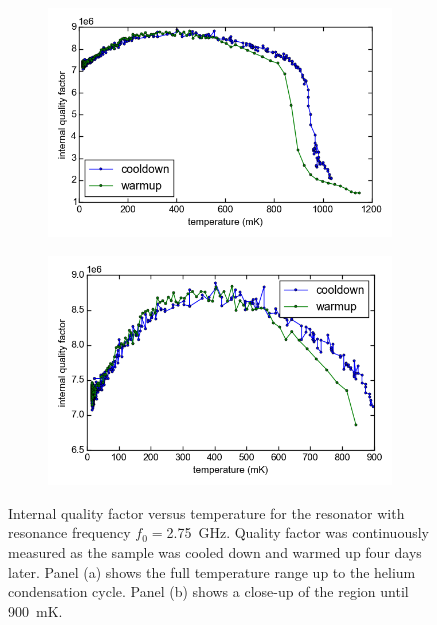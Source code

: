 \documentclass[12pt]{report}
\newcommand{\figureinset}[3]{\llap{\parbox[b]{#2in}{#1\\\rule{0ex}{#3in}}}}
\begin{document}
\begin{figure}[h]
    \centering
    \begin{subfigure}[b]{.49\textwidth}
        \label{fig:temperature_tracking_Qi_drop}
        \includegraphics[width=\textwidth]{Figures/Temperature tracking drop - Qi vs T.png}\figureinset{(a)}{2.65}{1.92}
    \end{subfigure}
    \begin{subfigure}[b]{.49\textwidth}
        \label{fig:temperature_tracking_Qi_nodrop}
        \includegraphics[width=\textwidth]{Figures/Temperature tracking - no drop - Qi vs T.png}\figureinset{(b)}{2.57}{1.92}
    \end{subfigure}
    \caption{Internal quality factor versus temperature for the resonator with resonance frequency $f_0= $\SI{2.75}{\giga \hertz}. Quality factor was continuously measured as the sample was cooled down and warmed up four days later. Panel (a) shows the full temperature range up to the helium condensation cycle. Panel (b) shows a close-up of the region until \SI{900}{\milli \kelvin}.}
    \label{fig:temperature_tracking_Qi}
\end{figure}
\end{document}
